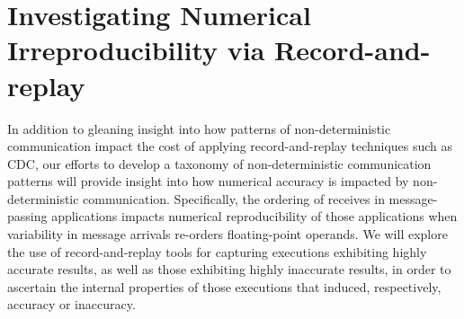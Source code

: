 
\section{Investigating Numerical Irreproducibility via Record-and-replay}

In addition to gleaning insight into how patterns of non-deterministic
communication impact the cost of applying record-and-replay techniques
such as CDC, our efforts to develop a taxonomy of non-deterministic
communication patterns will provide insight into how numerical
accuracy is impacted by non-deterministic communication. Specifically,
the ordering of receives in message-passing applications impacts
numerical reproducibility of those applications when variability in
message arrivals re-orders floating-point operands. We will explore
the use of record-and-replay tools for capturing executions exhibiting
highly accurate results, as well as those exhibiting highly inaccurate
results, in order to ascertain the internal properties of those
executions that induced, respectively, accuracy or inaccuracy.

